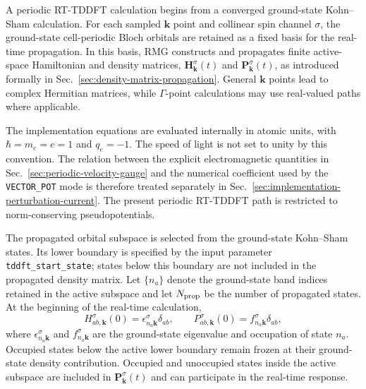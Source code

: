 

A periodic RT-TDDFT calculation begins from a converged ground-state
Kohn--Sham calculation.  For each sampled $\mathbf k$ point and
collinear spin channel $\sigma$, the ground-state cell-periodic Bloch
orbitals are retained as a fixed basis for the real-time propagation.
In this basis, RMG constructs and propagates finite active-space
Hamiltonian and density matrices,
$\mathbf H_{\mathbf k}^{\sigma}(t)$ and
$\mathbf P_{\mathbf k}^{\sigma}(t)$, as introduced formally in
Sec.~\ref{sec:density-matrix-propagation}.  General $\mathbf k$ points
lead to complex Hermitian matrices, while $\Gamma$-point calculations
may use real-valued paths where applicable.

The implementation equations are evaluated internally in atomic units,
with $\hbar=m_e=e=1$ and $q_e=-1$.  The speed of light is not set to
unity by this convention.  The relation between the explicit
electromagnetic quantities in Sec.~\ref{sec:periodic-velocity-gauge}
and the numerical coefficient used by the \texttt{VECTOR\_POT} mode is
therefore treated separately in
Sec.~\ref{sec:implementation-perturbation-current}.  The present
periodic RT-TDDFT path is restricted to norm-conserving
pseudopotentials.

The propagated orbital subspace is selected from the ground-state
Kohn--Sham states.  Its lower boundary is specified by the input
parameter \texttt{tddft\_start\_state}; states below this boundary are
not included in the propagated density matrix.  Let $\{n_a\}$ denote
the ground-state band indices retained in the active subspace and let
$N_{\rm prop}$ be the number of propagated states.  At the beginning of
the real-time calculation,
\begin{equation}
  H_{ab,\mathbf k}^{\sigma}(0)
  =
  \epsilon_{n_a\mathbf k}^{\sigma}\delta_{ab},
  \qquad
  P_{ab,\mathbf k}^{\sigma}(0)
  =
  f_{n_a\mathbf k}^{\sigma}\delta_{ab},
  \label{eq:impl_initial_h_p}
\end{equation}
where $\epsilon_{n_a\mathbf k}^{\sigma}$ and
$f_{n_a\mathbf k}^{\sigma}$ are the ground-state eigenvalue and
occupation of state $n_a$.  Occupied states below the active lower
boundary remain frozen at their ground-state density contribution.
Occupied and unoccupied states inside the active subspace are included
in $\mathbf P_{\mathbf k}^{\sigma}(t)$ and can participate in the
real-time response.

